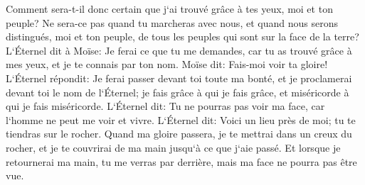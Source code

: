\verse Comment sera-t-il donc certain que j`ai trouvé grâce à tes yeux, moi et ton peuple? Ne sera-ce pas quand tu marcheras avec nous, et quand nous serons distingués, moi et ton peuple, de tous les peuples qui sont sur la face de la terre? 
\verse L`Éternel dit à Moïse: Je ferai ce que tu me demandes, car tu as trouvé grâce à mes yeux, et je te connais par ton nom. 
\verse Moïse dit: Fais-moi voir ta gloire! 
\verse L`Éternel répondit: Je ferai passer devant toi toute ma bonté, et je proclamerai devant toi le nom de l`Éternel; je fais grâce à qui je fais grâce, et miséricorde à qui je fais miséricorde. 
\verse L`Éternel dit: Tu ne pourras pas voir ma face, car l`homme ne peut me voir et vivre. 
\verse L`Éternel dit: Voici un lieu près de moi; tu te tiendras sur le rocher. 
\verse Quand ma gloire passera, je te mettrai dans un creux du rocher, et je te couvrirai de ma main jusqu`à ce que j`aie passé. 
\verse Et lorsque je retournerai ma main, tu me verras par derrière, mais ma face ne pourra pas être vue. 

